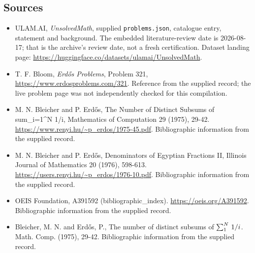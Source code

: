 \documentclass[11pt,a4paper]{article}
\begin{document}
\subsection{Sources}

{\small

\begin{itemize}

\item[\hypertarget{source:statement:1}{S1}] ULAM.AI, \emph{UnsolvedMath}, supplied \texttt{problems.json}, catalogue entry, statement and background. The embedded literature-review date is 2026-08-17; that is the archive’s review date, not a fresh certification. Dataset landing page: \url{https://huggingface.co/datasets/ulamai/UnsolvedMath}.

\item[\hypertarget{source:statement:2}{S2}] T. F. Bloom, \emph{Erdős Problems}, Problem 321, \url{https://www.erdosproblems.com/321}. Reference from the supplied record; the live problem page was not independently checked for this compilation.

\item[\hypertarget{source:statement:3}{S3}] M. N. Bleicher and P. Erdős, The Number of Distinct Subsums of sum\_{i=1}\textasciicircum{}N 1/i, Mathematics of Computation 29 (1975), 29-42. \url{https://www.renyi.hu/~p_erdos/1975-45.pdf}. Bibliographic information from the supplied record.

\item[\hypertarget{source:statement:4}{S4}] M. N. Bleicher and P. Erdős, Denominators of Egyptian Fractions II, Illinois Journal of Mathematics 20 (1976), 598-613. \url{https://users.renyi.hu/~p_erdos/1976-10.pdf}. Bibliographic information from the supplied record.

\item[\hypertarget{source:statement:5}{S5}] OEIS Foundation, A391592 (bibliographic\_index). \url{https://oeis.org/A391592}. Bibliographic information from the supplied record.

\item[\hypertarget{source:statement:6}{S6}] Bleicher, M. N. and Erd\H{o}s, P., The number of distinct subsums of $\sum \sb{1}^{N}\,1/i$. Math. Comp. (1975), 29-42. Bibliographic information from the supplied record.

\end{itemize}

}

\label{end:statement}
\end{document}
